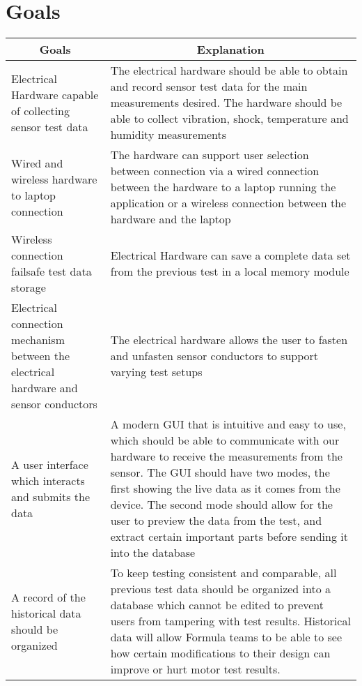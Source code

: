 \documentclass[12pt,titlepage]{article}
\begin{document}
\section{Goals}
    \begin{longtable}{|p{6cm}|p{10cm}|}
    \hline
    \multicolumn{1}{|c|}{\textbf{Goals}} & \multicolumn{1}{c|}{\textbf{Explanation}} 
    \\ \hline
    Electrical Hardware capable of collecting sensor test data
    & The electrical hardware should be able to obtain and record sensor test data for the main measurements desired. The hardware should be able to collect vibration, shock, temperature and humidity measurements
    \newline                                
    \\ \hline
    Wired and wireless hardware to laptop connection
    & The hardware can support user selection between connection via a wired connection between the hardware to a laptop running the application or a wireless connection between the hardware and the laptop
    \newline                                
    \\ \hline
    Wireless connection failsafe test data storage
    & Electrical Hardware can save a complete data set from the previous test in a local memory module
    \newline                                
    \\ \hline
    Electrical connection mechanism between the electrical hardware and sensor conductors
    & The electrical hardware allows the user to fasten and unfasten sensor conductors to support varying test setups
    \newline                                
    \\ \hline
    A user interface which interacts and submits the data                                 
    & A modern GUI that is intuitive and easy to use, which should be able to communicate with our hardware to receive the measurements from the sensor. The GUI should have two modes, the first showing the live data as it comes from the device. The second mode should allow for the user to preview the data from the test, and extract certain important parts before sending it into the database  
    \newline                                
    \\ \hline
    A record of the historical data should be organized                                
    & To keep testing consistent and comparable, all previous test data should be organized into a database which cannot be edited to prevent users from tampering with test results. Historical data will allow Formula teams to be able to see how certain modifications to their design can improve or hurt motor test results. 

\end{longtable}
\end{document}
